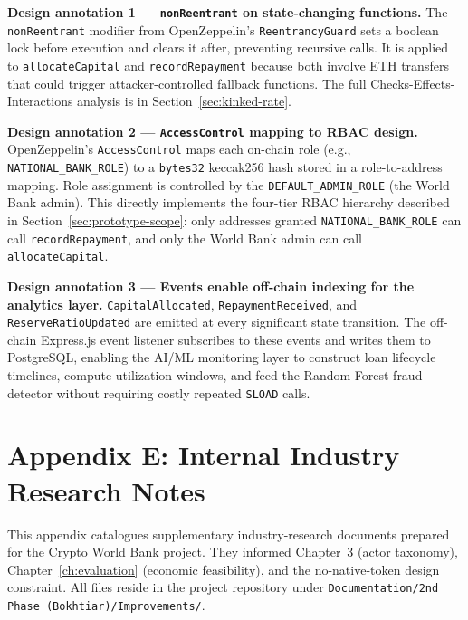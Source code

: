 \documentclass[12pt,a4paper]{report}
\begin{document}
\textbf{Design annotation 1 --- \texttt{nonReentrant} on state-changing functions.}
The \texttt{nonReentrant} modifier from OpenZeppelin's \texttt{ReentrancyGuard} sets a boolean lock before execution and clears it after, preventing recursive calls. It is applied to \texttt{allocateCapital} and \texttt{recordRepayment} because both involve ETH transfers that could trigger attacker-controlled fallback functions. The full Checks-Effects-Interactions analysis is in Section~\ref{sec:kinked-rate}.

\textbf{Design annotation 2 --- \texttt{AccessControl} mapping to RBAC design.}
OpenZeppelin's \texttt{AccessControl} maps each on-chain role (e.g., \texttt{NATIONAL\_BANK\_ROLE}) to a \texttt{bytes32} keccak256 hash stored in a role-to-address mapping. Role assignment is controlled by the \texttt{DEFAULT\_ADMIN\_ROLE} (the World Bank admin). This directly implements the four-tier RBAC hierarchy described in Section~\ref{sec:prototype-scope}: only addresses granted \texttt{NATIONAL\_BANK\_ROLE} can call \texttt{recordRepayment}, and only the World Bank admin can call \texttt{allocateCapital}.

\textbf{Design annotation 3 --- Events enable off-chain indexing for the analytics layer.}
\texttt{CapitalAllocated}, \texttt{RepaymentReceived}, and \texttt{ReserveRatioUpdated} are emitted at every significant state transition. The off-chain Express.js event listener subscribes to these events and writes them to PostgreSQL, enabling the AI/ML monitoring layer to construct loan lifecycle timelines, compute utilization windows, and feed the Random Forest fraud detector without requiring costly repeated \texttt{SLOAD} calls.

\chapter*{Appendix E: Internal Industry Research Notes}
{}
\label{app:internal-research}

This appendix catalogues supplementary industry-research documents prepared for the Crypto World Bank project. They informed Chapter~3 (actor taxonomy), Chapter~\ref{ch:evaluation} (economic feasibility), and the no-native-token design constraint. All files reside in the project repository under \texttt{Documentation/2nd Phase (Bokhtiar)/Improvements/}.
\end{document}
